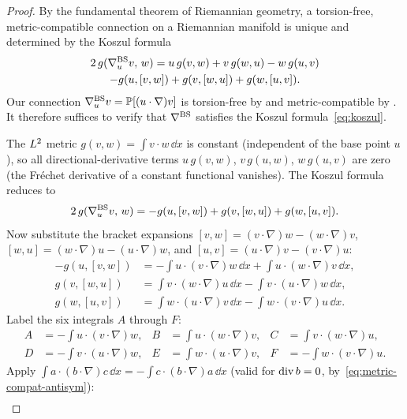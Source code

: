 \begin{proof}
  By the fundamental theorem of Riemannian geometry, a torsion-free,
  metric-compatible connection on a Riemannian manifold is unique and determined
  by the Koszul formula
  \begin{multline}\label{eq:koszul}
    2\,g(\nabla^{\mathrm{BS}}_u v,\, w)
    = u\,g(v,w) + v\,g(w,u) - w\,g(u,v) \\
      - g(u, [v,w]) + g(v, [w,u]) + g(w, [u,v]).
  \end{multline}
  Our connection $\nabla^{\mathrm{BS}}_u v = \mathbb{P}[(u\cdot\nabla)v]$ is torsion-free by
   and metric-compatible by .
  It therefore suffices to verify that $\nabla^{\mathrm{BS}}$ satisfies the Koszul
  formula~\eqref{eq:koszul}.

  The $L^{2}$ metric $g(v,w) = \int v\cdot w\,\dd x$ is constant (independent
  of the base point $u$), so all directional-derivative terms
  $u\,g(v,w)$, $v\,g(u,w)$, $w\,g(u,v)$ are zero (the Fr\'{e}chet derivative of
  a constant functional vanishes).  The Koszul formula reduces to
  \begin{equation}\label{eq:koszul-reduced}
    2\,g(\nabla^{\mathrm{BS}}_u v,\, w)
    = -g(u, [v,w]) + g(v, [w,u]) + g(w, [u,v]).
  \end{equation}
  Now substitute the bracket expansions $[v,w] = (v\cdot\nabla)w - (w\cdot\nabla)v$,
  $[w,u] = (w\cdot\nabla)u - (u\cdot\nabla)w$, and $[u,v] = (u\cdot\nabla)v -
  (v\cdot\nabla)u$:
  \begin{align*}
    -g(u, [v,w])
    &= -\int u\cdot(v\cdot\nabla)w\,\dd x + \int u\cdot(w\cdot\nabla)v\,\dd x, \\
    g(v, [w,u])
    &= \int v\cdot(w\cdot\nabla)u\,\dd x - \int v\cdot(u\cdot\nabla)w\,\dd x, \\
    g(w, [u,v])
    &= \int w\cdot(u\cdot\nabla)v\,\dd x - \int w\cdot(v\cdot\nabla)u\,\dd x.
  \end{align*}
  Label the six integrals $A$ through $F$:
  \begin{align*}
    A &= -\!\int u\cdot(v\cdot\nabla)w, &
    B &= \int u\cdot(w\cdot\nabla)v, &
    C &= \int v\cdot(w\cdot\nabla)u, \\
    D &= -\!\int v\cdot(u\cdot\nabla)w, &
    E &= \int w\cdot(u\cdot\nabla)v, &
    F &= -\!\int w\cdot(v\cdot\nabla)u.
  \end{align*}
  Apply $\int a\cdot(b\cdot\nabla)c\,\dd x = -\int c\cdot(b\cdot\nabla)a\,\dd x$
  (valid for $\operatorname{div} b = 0$, by~\eqref{eq:metric-compat-antisym}):
  \begin{align*}

\end{align*}
\end{proof}
